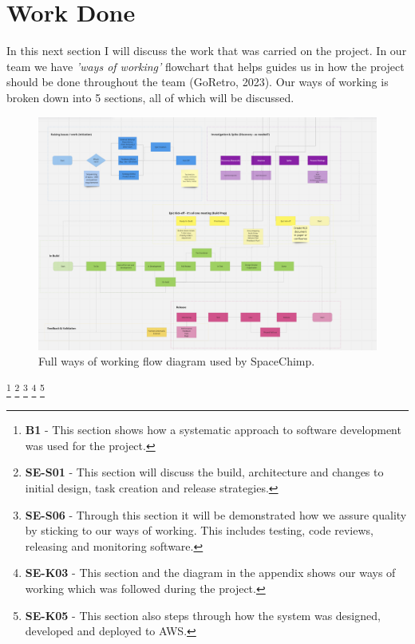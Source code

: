 \section{Work Done}
  In this next section I will discuss the work that was carried on the project. In our team we have \textit{'ways of working'}
  flowchart that helps guides us in how the project should be done throughout the team (GoRetro, 2023). Our ways of working is broken down into 5 sections, 
  all of which will be discussed.

  \begin{figure}[H]
    \centering
    \includegraphics[width=12cm]{assets/workflow/fullWorkflow.png}
    \caption{Full ways of working flow diagram used by SpaceChimp.}
    \label{fig:fullWorkflow}
  \end{figure}

  \footnote{\textbf{B1} - This section shows how a systematic approach to software development was used for the project.}
  \footnote{\textbf{SE-S01} - This section will discuss the build, architecture and changes to initial design, task creation and release strategies.}
  \footnote{\textbf{SE-S06} - Through this section it will be demonstrated how we assure quality by sticking to our ways of working. This includes testing, 
  code reviews, releasing and monitoring software.}
  \footnote{\textbf{SE-K03} - This section and the diagram in the appendix shows our ways of working which was followed during the project.}
  \footnote{\textbf{SE-K05} - This section also steps through how the system was designed, developed and deployed to AWS.}

  \newpage

  
  
  
  
  

  \newpage
  
  